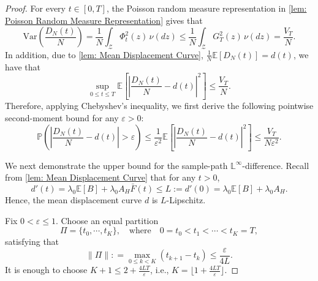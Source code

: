 \documentclass[10pt,a4paper]{amsart}
\newcommand{\E}{\mathbb E}
\newcommand{\pro}{\mathbb P}
\begin{document}
\begin{proof}

    For every $t\in[0,T]$, the Poisson random measure representation in \cref{lem: Poisson Random Measure Representation} gives that
    \begin{equation}
    \label{equ: displacement variance exact}
        \text{Var}\left(\frac{D_N(t)}{N}\right)=\frac{1}{N}\int_{\mathcal Z}\Phi_t^2(z)\,\nu(dz) \leq \frac{1}{N}\int_{\mathcal Z}G_T^2(z)\,\nu(dz) =\frac{V_T}{N}.
    \end{equation}
    In addition, due to \cref{lem: Mean Displacement Curve}, $\frac{1}{N}\E[D_N(t)] = d(t)$, we have that 
    \begin{equation}
        \label{equ: displacement MSE upper bound}
        \sup_{0\leq t\leq T}\E\left[\left|\frac{D_N(t)}{N}-d(t)\right|^2\right]\leq\frac{V_T}{N}.
    \end{equation}
    Therefore, applying Chebyshev's inequality, we first derive the following pointwise second-moment bound for any $\varepsilon>0$:
    \begin{equation*}
        \pro\left(\left|\frac{D_N(t)}{N}-d(t)\right|>\varepsilon\right)\leq\frac{1}{\varepsilon^2}\E\left[\left|\frac{D_N(t)}{N}-d(t)\right|^2\right]\leq\frac{V_T}{N\varepsilon^2}.
    \end{equation*}

    We next demonstrate the upper bound for the sample-path $\mathbb L^\infty$-difference. Recall from \cref{lem: Mean Displacement Curve} that for any $t>0$,
    \begin{equation*}
        d'(t)=\lambda_0\E[B]+\lambda_0A_H \bar F(t) \leq L := d'(0)=\lambda_0\E[B]+\lambda_0A_H.
    \end{equation*}
    Hence, the mean displacement curve $d$ is $L$-Lipschitz.

    Fix $0<\varepsilon\leq1$. Choose an equal partition
    \begin{equation*}
        \Pi = \{t_0,\cdots,t_K\},\quad \text{where}\quad 0=t_0<t_1<\cdots<t_K=T,
    \end{equation*}
    satisfying that
    \begin{equation*}
    \|\Pi\| : =\max_{0\leq k<K}(t_{k+1}-t_k)\leq\frac{\varepsilon}{4 L }.
    \end{equation*}
    It is enough to choose $K+1\leq 2+\frac{4 L T}{\varepsilon}$, i.e., $K=  \lfloor1+\frac{4 L T}{\varepsilon}\rfloor$.


\end{proof}
\end{document}
